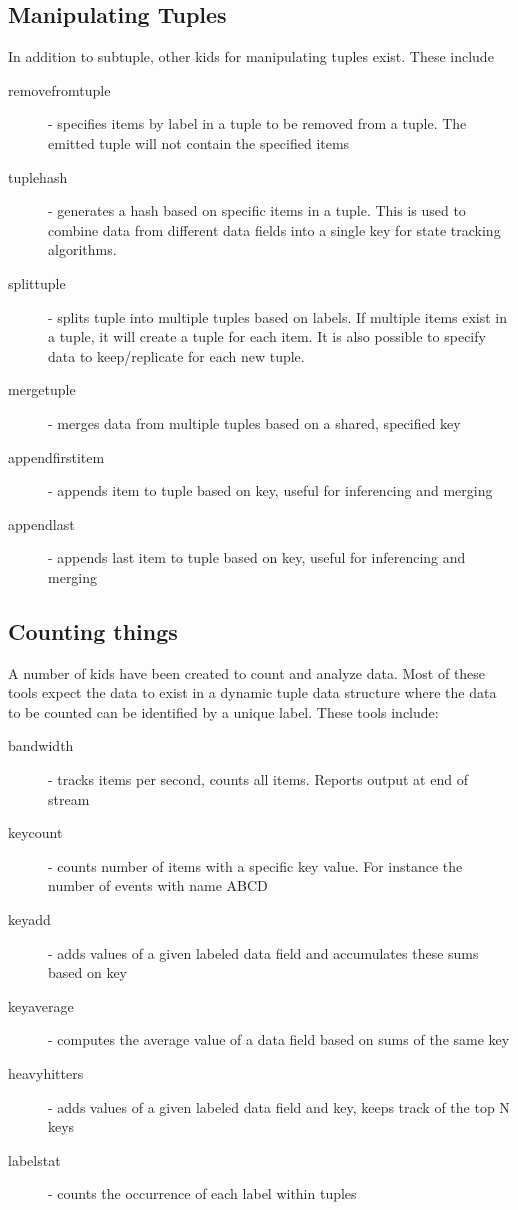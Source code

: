 \documentclass[11pt]{article}
\begin{document}
\subsection {Manipulating Tuples}
In addition to subtuple, other kids for manipulating tuples exist.  These include
\begin{description}
\item [removefromtuple] - specifies items by label in a tuple to be removed from a tuple. The emitted tuple will not contain the specified items
\item [tuplehash] - generates a hash based on specific items in a tuple.  This is used to combine
data from different data fields into a single key for state tracking algorithms.
\item [splittuple] - splits tuple into multiple tuples based on labels.  If multiple items exist in
a tuple, it will create a tuple for each item.  It is also possible to specify data to
keep/replicate for each new tuple.
\item [mergetuple] - merges data from multiple tuples based on a shared, specified key
\item [appendfirstitem] - appends item to tuple based on key, useful for inferencing and merging
\item [appendlast] - appends last item to tuple based on key, useful for inferencing and merging
\end{description}


\subsection {Counting things}
A number of kids have been created to count and analyze data.  Most of these tools expect the data
to exist in a dynamic tuple data structure where the data to be counted can be identified by a
unique label.  These tools include:

\begin{description}
\item [bandwidth] - tracks items per second, counts all items.  Reports output at end of stream
\item [keycount] - counts number of items with a specific key value.  For instance the number of
events with name ABCD
\item [keyadd] - adds values of a given labeled data field and accumulates these sums based on key
\item [keyaverage] - computes the average value of a data field based on sums of the same key
\item [heavyhitters] - adds values of a given labeled data field and key, keeps track of the top N
keys
\item [labelstat] - counts the occurrence of each label within tuples
\end{description}
\end{document}
